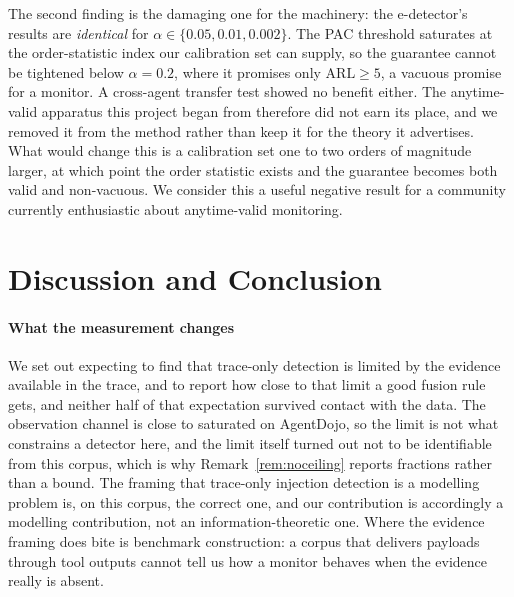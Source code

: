 \documentclass[pdflatex,sn-basic]{sn-jnl}%
\theoremstyle{thmstyleone}
\theoremstyle{thmstyletwo}
\theoremstyle{thmstylethree}
\begin{document}
The second finding is the damaging one for the machinery: the e-detector's results
are \emph{identical} for $\alpha \in \{0.05, 0.01, 0.002\}$. The PAC threshold
saturates at the order-statistic index our calibration set can supply, so the
guarantee cannot be tightened below $\alpha = 0.2$, where it promises only
$\mathrm{ARL} \ge 5$, a vacuous promise for a monitor. A cross-agent transfer test
showed no benefit either. The anytime-valid apparatus this project began from
therefore did not earn its place, and we removed it from the method rather than
keep it for the theory it advertises. What would change this is a calibration set
one to two orders of magnitude larger, at which point the order statistic exists
and the guarantee becomes both valid and non-vacuous. We consider this a useful negative
result for a community currently enthusiastic about anytime-valid monitoring.

\section{Discussion and Conclusion}\label{sec:discussion}

\paragraph{What the measurement changes} We set out expecting to find that
trace-only detection is limited by the evidence available in the trace, and to
report how close to that limit a good fusion rule gets, and neither half of that
expectation survived contact with the data. The observation channel is close to
saturated on AgentDojo, so the limit is not what constrains a detector here, and the
limit itself turned out not to be identifiable
from this corpus, which is why Remark~\ref{rem:noceiling} reports fractions rather
than a bound. The framing that trace-only injection detection is a modelling
problem is, on this corpus, the correct one, and our contribution is accordingly a
modelling contribution, not an information-theoretic one. Where the evidence framing
does bite is benchmark construction: a corpus that delivers payloads through tool
outputs cannot tell us how a monitor behaves when the evidence really is absent.
\end{document}
